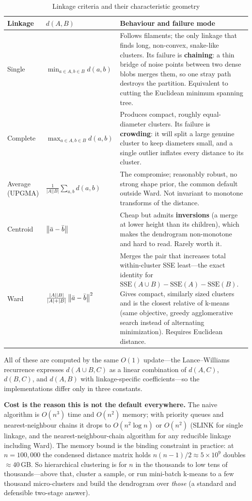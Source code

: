 \begin{table}[H]
\centering
\small
\caption{Linkage criteria and their characteristic geometry}
\label{cml:tab:linkage}
\begin{tabularx}{\textwidth}{@{}l l X@{}}
\toprule
\textbf{Linkage} & \textbf{$d(A,B)$} & \textbf{Behaviour and failure mode} \\
\midrule
Single & $\min_{a \in A, b \in B} d(a,b)$ & Follows filaments; the only linkage that finds long, non-convex, snake-like clusters. Its failure is \textbf{chaining}: a thin bridge of noise points between two dense blobs merges them, so one stray path destroys the partition. Equivalent to cutting the Euclidean minimum spanning tree. \\
Complete & $\max_{a \in A, b \in B} d(a,b)$ & Produces compact, roughly equal-diameter clusters. Its failure is \textbf{crowding}: it will split a large genuine cluster to keep diameters small, and a single outlier inflates every distance to its cluster. \\
Average (UPGMA) & $\frac{1}{|A||B|}\sum_{a,b} d(a,b)$ & The compromise; reasonably robust, no strong shape prior, the common default outside Ward. Not invariant to monotone transforms of the distance. \\
Centroid & $\left\lVert\bar{a} - \bar{b}\right\rVert$ & Cheap but admits \textbf{inversions} (a merge at lower height than its children), which makes the dendrogram non-monotone and hard to read. Rarely worth it. \\
Ward & $\frac{|A||B|}{|A|+|B|}\left\lVert\bar{a} - \bar{b}\right\rVert^2$ & Merges the pair that increases total within-cluster SSE least---the exact identity for $\mathrm{SSE}(A \cup B) - \mathrm{SSE}(A) - \mathrm{SSE}(B)$. Gives compact, similarly sized clusters and is the closest relative of k-means (same objective, greedy agglomerative search instead of alternating minimization). Requires Euclidean distance. \\
\bottomrule
\end{tabularx}
\end{table}

All of these are computed by the same $O(1)$ update---the Lance--Williams recurrence expresses $d(A \cup B, C)$ as a linear combination of $d(A,C)$, $d(B,C)$, and $d(A,B)$ with linkage-specific coefficients---so the implementations differ only in three constants.

\textbf{Cost is the reason this is not the default everywhere.} The naive algorithm is $O(n^3)$ time and $O(n^2)$ memory; with priority queues and nearest-neighbour chains it drops to $O(n^2 \log n)$ or $O(n^2)$ (SLINK for single linkage, and the nearest-neighbour-chain algorithm for any reducible linkage including Ward). The memory bound is the binding constraint in practice: at $n = 100{,}000$ the condensed distance matrix holds $n(n-1)/2 \approx 5\times10^9$ doubles $\approx 40$\,GB. So hierarchical clustering is for $n$ in the thousands to low tens of thousands---above that, cluster a sample, or run mini-batch k-means to a few thousand micro-clusters and build the dendrogram over \emph{those} (a standard and defensible two-stage answer).


